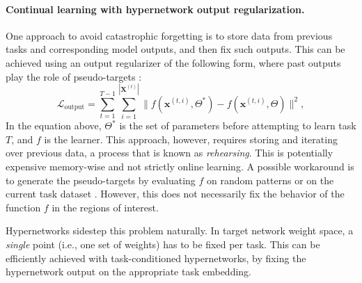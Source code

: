 \documentclass{article}
\begin{document}
\vspace{-3mm}
\paragraph{Continual learning with hypernetwork output regularization.} One approach to avoid catastrophic forgetting is to store data from previous tasks and corresponding model outputs, and then fix such outputs. This can be achieved using an output regularizer of the following form, where past outputs play the role of pseudo-targets \citep{robins_catastrophic_1995,li_learning_2018,benjamin_measuring_2018}:
\begin{equation}
  \label{eq:L-output}
  \mathcal{L}_\text{output} = \sum_{t=1}^{T-1} \sum_{i=1}^{|\mathbf{X}^{(t)}|}\| f(\mathbf{x}^{(t,i)}, \Theta^*) - f(\mathbf{x}^{(t,i)}, \Theta)\|^2,
\end{equation}
In the equation above, $\Theta^*$ is the set of parameters before attempting to learn task $T$, and $f$ is the learner. This approach, however, requires storing and iterating over previous data, a process that is known as \emph{rehearsing}. This is potentially expensive memory-wise and not strictly online learning. A possible workaround is to generate the pseudo-targets by evaluating $f$ on random patterns \citep{robins_catastrophic_1995} or on the current task dataset \citep{li_learning_2018}. However, this does not necessarily fix the behavior of the function $f$ in the regions of interest.

Hypernetworks sidestep this problem naturally. In target network weight space, a \emph{single} point (i.e., one set of weights) has to be fixed per task. This can be efficiently achieved with task-conditioned hypernetworks, by fixing the hypernetwork output on the appropriate task embedding.
\end{document}
